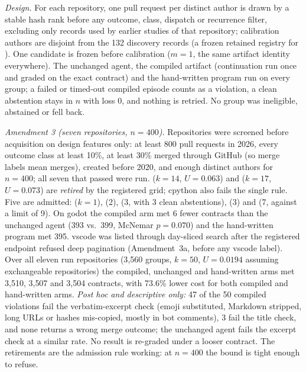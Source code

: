 \emph{Design.} For each repository, one pull request per distinct author is drawn
by a stable hash rank before any outcome, class, dispatch or recurrence filter,
excluding only records used by earlier studies of that repository; calibration
authors are disjoint from the 132 discovery records (a frozen retained registry for
). One candidate is frozen before calibration ($m=1$,
the same artifact identity everywhere). The unchanged agent, the compiled artifact
(continuation run once and graded on the exact contract) and the hand-written
program run on every group; a failed or timed-out compiled episode counts as a
violation, a clean abstention stays in $n$ with loss 0, and nothing is retried. No
group was ineligible, abstained or fell back.

\begin{table}[t]
  \centering
  \caption{Unfiltered, author-unit end-to-end calibration (grid: $\alpha=0.05$,
  $\delta=0.10$, $|\Lambda|=11$), registered stage and Amendment~3. Top:
  certificates, retirements included. Bottom: resource reductions against the
  unchanged agent.}
  \label{tab:multirepo-e2e}
  \footnotesize
  
\end{table}

\emph{Amendment 3 (seven repositories, $n=400$).} Repositories were screened
before acquisition on design features only: at least 800 pull requests in 2026,
every outcome class at least 10\%, at least 30\% merged through GitHub (so merge
labels mean merges), created before 2020, and enough distinct authors for
$n=400$; all seven that passed were run.  ($k=14$, $U=0.063$)
and  ($k=17$, $U=0.073$) are \emph{retired} by the
registered grid; cpython also fails the single rule. Five are admitted:
 ($k=1$),  (2),
 (3, with 3 clean abstentions),
 (3) and  (7, against a limit of
9). On godot the compiled arm met 6 fewer contracts than the unchanged agent
(393 vs.\ 399, McNemar $p=0.070$) and the hand-written program met 395. vscode
was listed through day-sliced search after the registered endpoint refused deep
pagination (Amendment~3a, before any vscode label). Over all eleven run
repositories (3{,}560 groups, $k=50$, $U=0.0194$ assuming exchangeable
repositories) the compiled, unchanged and hand-written arms met 3{,}510, 3{,}507
and 3{,}504 contracts, with 73.6\% lower cost for both compiled and hand-written
arms. \emph{Post hoc and descriptive only:} 47 of the 50 compiled violations fail
the verbatim-excerpt check (emoji substituted, Markdown stripped, long URLs or
hashes mis-copied, mostly in bot comments), 3 fail the title check, and none
returns a wrong merge outcome; the unchanged agent fails the excerpt check at a
similar rate. No result is re-graded under a looser contract. The retirements are
the admission rule working: at $n=400$ the bound is tight enough to refuse.

